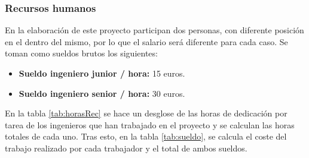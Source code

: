 \subsubsection{Recursos humanos}
En la elaboración de este proyecto participan dos personas, con diferente posición en el dentro del mismo, por lo que el salario será diferente para cada caso. Se toman como sueldos brutos los siguientes:

\begin{itemize}
\item \textbf{Sueldo ingeniero junior / hora:} 15 euros.
\item \textbf{Sueldo ingeniero senior / hora:} 30 euros.
\end{itemize}

En la tabla \ref{tab:horasRec} se hace un desglose de las horas de dedicación por tarea de los ingenieros que han trabajado en el proyecto y se calculan las horas totales de cada uno. Tras esto, en la tabla \ref{tab:sueldo}, se calcula el coste del trabajo realizado por cada trabajador y el total de ambos sueldos.

